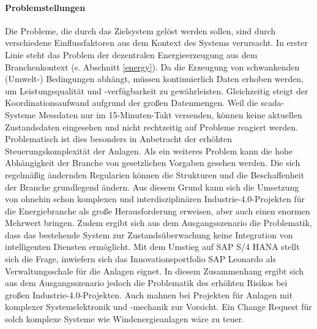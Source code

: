 \paragraph{Problemstellungen}
Die Probleme, die durch das Zielsystem gelöst werden sollen, sind durch verschiedene Einflussfaktoren aus dem Kontext des Systems verursacht. In erster Linie steht das Problem der dezentralen Energieerzeugung aus dem Branchenkontext (s. Abschnitt \ref{energy}). Da die Erzeugung von schwankenden (Umwelt-) Bedingungen abhängt, müssen kontinuierlich Daten erhoben werden, um Leistungsqualität und -verfügbarkeit zu gewährleisten. Gleichzeitig steigt der Koordinationsaufwand aufgrund der großen Datenmengen. Weil die \ac{scada}-Systeme Messdaten nur im 15-Minuten-Takt versenden, können keine aktuellen Zustandsdaten eingesehen und nicht rechtzeitig auf Probleme reagiert werden. Problematisch ist dies besonders in Anbetracht der erhöhten Steuerungskomplexität der Anlagen.
Als ein weiteres Problem kann die hohe Abhängigkeit der Branche von gesetzlichen Vorgaben gesehen werden. Die sich regelmäßig ändernden Regularien können die Strukturen und die Beschaffenheit der Branche grundlegend ändern. Aus diesem Grund kann sich die Umsetzung von ohnehin schon komplexen und interdisziplinären Industrie-4.0-Projekten für die Energiebranche als große Herausforderung erweisen, aber auch einen enormen Mehrwert bringen. Zudem ergibt sich aus dem Ausgangsszenario die Problematik, dass das bestehende System zur Zustandsüberwachung keine Integration von intelligenten Diensten ermöglicht. Mit dem Umstieg auf SAP S/4 HANA stellt sich die Frage, inwiefern sich das  Innovationsportfolio SAP Leonardo als Verwaltungsschale für die Anlagen eignet. In diesem Zusammenhang ergibt sich aus dem Ausgangsszenario jedoch die Problematik des erhöhten Risikos bei großen Industrie-4.0-Projekten. Auch \citet{Lauenroth2016} mahnen bei Projekten für Anlagen mit komplexer Systemelektronik und -mechanik zur Vorsicht. Ein Change Request für solch komplexe Systeme wie Windenergieanlagen wäre zu teuer.

